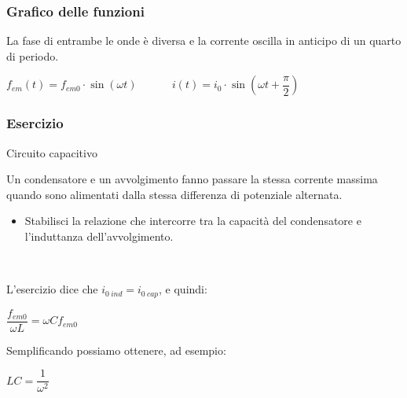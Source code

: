 \documentclass[]{beamer}
\theoremstyle{plain}
\newcommand{\fem}{f_{em}}
\newcommand{\femm}{f_{em0}}
\begin{document}
\begin{frame}
\frametitle{Grafico delle funzioni}
La fase di entrambe le onde è diversa e la corrente oscilla in \alert{anticipo di un quarto di periodo}.
\begin{figure}
\end{figure}
\begin{center}
$ \fem(t) = \femm \cdot \sin (\omega t) $
~~~~~   $ i(t) = i_0 \cdot \sin \left( \omega t + \dfrac{\pi}{2} \right) $
\end{center}
\end{frame}


\begin{frame}
\frametitle{Esercizio}
\begin{exampleblock}{Circuito capacitivo}
  \small{
    Un condensatore e un avvolgimento fanno passare la stessa corrente massima quando sono alimentati dalla stessa differenza di potenziale alternata.
    \begin{itemize}
      \item Stabilisci la relazione che intercorre tra la capacità del condensatore e l'induttanza dell'avvolgimento.
    \end{itemize}}
\end{exampleblock}\pause

~

L'esercizio dice che $ i_{0 ~ ind} = i_{0 ~ cap} $, e quindi:
\begin{center}
  $ \dfrac{\femm}{\omega L} = \omega C \femm $
\end{center}\pause
Semplificando possiamo ottenere, ad esempio:
\begin{center}
  $ LC = \dfrac{1}{\omega^2} $
\end{center}
\end{frame}
\end{document}
